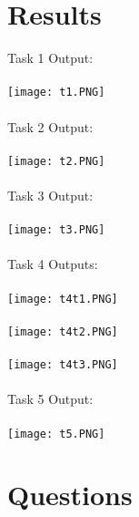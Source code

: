 \documentclass[12pt]{report}
\begin{document}
\section{Results}
Task 1 Output:
\\
\\ \texttt{[image: t1.PNG]}
\\
\\ Task 2 Output:
\\
\\ \texttt{[image: t2.PNG]}
\\
\\ Task 3 Output:
\\
\\ \texttt{[image: t3.PNG]}
\\
\\ Task 4 Outputs:
\\
\\ \texttt{[image: t4t1.PNG]}
\\
\\ \texttt{[image: t4t2.PNG]}
\\
\\ \texttt{[image: t4t3.PNG]}
\\
\\ Task 5 Output:
\\
\\ \texttt{[image: t5.PNG]}


\section{Questions}
\end{document}
